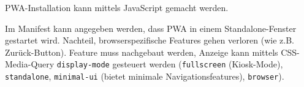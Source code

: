 \documentclass[10pt,landscape]{article}
\begin{document}
\begin{multicols}{2}
        PWA-Installation kann mittels JavaScript gemacht werden.

        Im Manifest kann angegeben werden, dass PWA in einem Standalone-Fenster gestartet wird.
        Nachteil, browserspezifische Features gehen verloren (wie z.B. Zurück-Button).
        Feature muss nachgebaut werden, Anzeige kann mittels CSS-Media-Query \lstinline{display-mode} gesteuert werden (\lstinline{fullscreen} (Kiosk-Mode), \lstinline{standalone}, \lstinline{minimal-ui} (bietet minimale Navigationsfeatures), \lstinline{browser}).
    \end{multicols}
\end{document}
